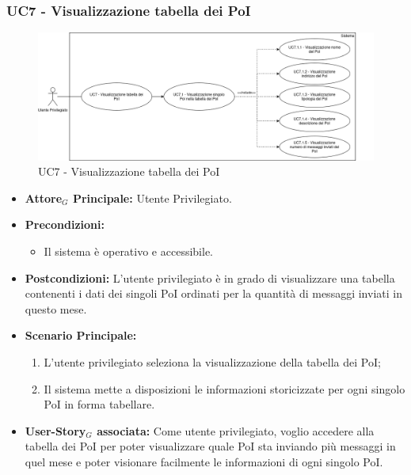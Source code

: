\documentclass[11pt]{article}
\begin{document}
\begin{justify}
\subsubsection{\textbf{UC7 - Visualizzazione tabella dei PoI}}
\begin{figure}[H]
    \centering
    \includegraphics[width=0.7\linewidth]{UC7image.png}
    \caption{UC7 - Visualizzazione tabella dei PoI}
    \label{fig:UC7}
\end{figure}
\label{UC7}
\begin{itemize}
    \item \textbf{Attore$_G$ Principale:} Utente Privilegiato.
    \item \textbf{Precondizioni:} 
        \begin{itemize}
          \item Il sistema è operativo e accessibile.
        \end{itemize}
      \item \textbf{Postcondizioni:} L'utente privilegiato è in grado di visualizzare una tabella contenenti i dati dei singoli PoI ordinati per la quantità di messaggi inviati in questo mese.\\
    \item \textbf{Scenario Principale:} 
        \begin{enumerate}
        \item L'utente privilegiato seleziona la visualizzazione della tabella dei PoI;
          \item Il sistema mette a disposizioni le informazioni storicizzate per ogni singolo PoI in forma tabellare.
        \end{enumerate}
    \item \textbf{User-Story$_G$ associata:} Come utente privilegiato, voglio accedere alla tabella dei PoI per poter visualizzare quale PoI sta inviando più messaggi in quel mese e poter visionare facilmente le informazioni di ogni singolo PoI.
\end{itemize}


\end{justify}
\end{document}
